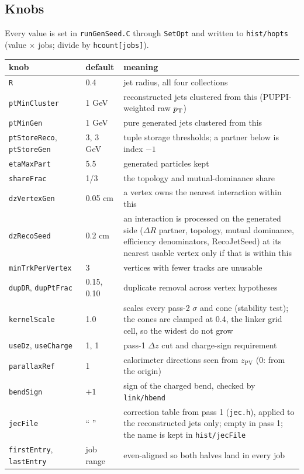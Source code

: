 \subsection{Knobs}
\label{s:knobs}
Every value is set in \texttt{runGenSeed.C} through \texttt{SetOpt} and written
to \texttt{hist/hopts} (value $\times$ jobs; divide by \texttt{hcount[jobs]}).

\begin{center}\small
\begin{tabular}{llp{8.6cm}}
\toprule
knob & default & meaning \\
\midrule
\texttt{R} & 0.4 & jet radius, all four collections \\
\texttt{ptMinCluster} & 1 GeV & reconstructed jets clustered from this (PUPPI-weighted raw $p_{\mathrm{T}}$) \\
\texttt{ptMinGen} & 1 GeV & pure generated jets clustered from this \\
\texttt{ptStoreReco}, \texttt{ptStoreGen} & 3, 3 GeV & tuple storage thresholds; a partner below is index $-1$ \\
\texttt{etaMaxPart} & 5.5 & generated particles kept \\
\texttt{shareFrac} & 1/3 & the topology and mutual-dominance share \\
\texttt{dzVertexGen} & 0.05 cm & a vertex owns the nearest interaction within this \\
\texttt{dzRecoSeed} & 0.2 cm & an interaction is processed on the generated side ($\Delta R$ partner, topology, mutual dominance, efficiency denominators, RecoJetSeed) at its nearest usable vertex only if that is within this \\
\texttt{minTrkPerVertex} & 3 & vertices with fewer tracks are unusable \\
\texttt{dupDR}, \texttt{dupPtFrac} & 0.15, 0.10 & duplicate removal across vertex hypotheses \\
\texttt{kernelScale} & 1.0 & scales every pass-2 $\sigma$ and cone (stability test); the cones are clamped at 0.4, the linker grid cell, so the widest do not grow \\
\texttt{useDz}, \texttt{useCharge} & 1, 1 & pass-1 $\Delta z$ cut and charge-sign requirement \\
\texttt{parallaxRef} & 1 & calorimeter directions seen from $z_{\mathrm{PV}}$ (0: from the origin) \\
\texttt{bendSign} & $+1$ & sign of the charged bend, checked by \texttt{link/hbend} \\
\texttt{jecFile} & `` '' & correction table from pass 1 (\texttt{jec.h}), applied to the reconstructed jets only; empty in pass 1; the name is kept in \texttt{hist/jecFile} \\
\texttt{firstEntry}, \texttt{lastEntry} & job range & even-aligned so both halves land in every job \\
\bottomrule
\end{tabular}
\end{center}

